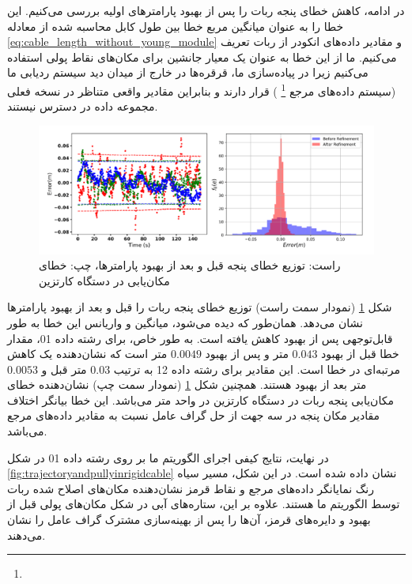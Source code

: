 در ادامه، کاهش خطای پنجه ربات را پس از بهبود پارامترهای اولیه بررسی می‌کنیم. این خطا را به عنوان میانگین مربع خطا بین طول کابل محاسبه شده از معادله 
\ref{eq:cable_length_without_young_module}
 و مقادیر داده‌های انکودر از ربات تعریف می‌کنیم. ما از این خطا به عنوان یک معیار جانشین برای مکان‌های نقاط پولی استفاده می‌کنیم زیرا در پیاده‌سازی ما، قرقره‌ها در خارج از میدان دید سیستم ردیابی ما (سیستم داده‌های مرجع
\footnote{}
 ) قرار دارند و بنابراین مقادیر واقعی متناظر در نسخه فعلی مجموعه داده در دسترس نیستند. 
 
 \begin{figure}
 	\centering
 	\includegraphics[width=0.9\linewidth]{img/calibration_result_rigid}
 	\caption{ راست: توزیع خطای پنجه قبل و بعد از بهبود پارامترها، چپ: خطای مکان‌یابی در دستگاه کارتزین}
 	\label{fig:calibrationresultrigid}
 \end{figure}
 
 شکل 
 \ref{fig:calibrationresultrigid}
 (نمودار سمت راست)
 توزیع خطای پنجه ربات را قبل و بعد از بهبود پارامترها نشان می‌دهد. همان‌طور که دیده می‌شود، میانگین و واریانس این خطا به طور قابل‌توجهی پس از بهبود کاهش یافته است. به طور خاص، برای رشته داده 01، مقدار خطا قبل از بهبود $0.043$ متر و پس از بهبود $0.0049$ متر است که نشان‌دهنده یک کاهش مرتبه‌ای در خطا است. این مقادیر برای رشته داده 12 به ترتیب $0.03$ متر قبل و $0.0053$ متر بعد از بهبود هستند. همچنین شکل 
  \ref{fig:calibrationresultrigid}
  (نمودار سمت چپ)
  نشان‌دهنده خطای مکان‌یابی پنجه ربات در دستگاه کارتزین در واحد متر می‌باشد. این خطا بیانگر اختلاف مقادیر مکان پنجه در سه جهت از حل گراف عامل نسبت به مقادیر داده‌های مرجع می‌باشد.

در نهایت، نتایج کیفی اجرای الگوریتم ما بر روی رشته داده 01 در شکل 
\ref{fig:trajectoryandpullyinrigidcable} 
نشان داده شده است. در این شکل، مسیر سیاه رنگ نمایانگر داده‌های مرجع و نقاط قرمز نشان‌دهنده مکان‌های اصلاح شده ربات توسط الگوریتم ما هستند. علاوه بر این، ستاره‌های آبی در شکل مکان‌های پولی قبل از بهبود و دایره‌های قرمز، آن‌ها را پس از بهینه‌سازی مشترک گراف عامل را نشان می‌دهند.

